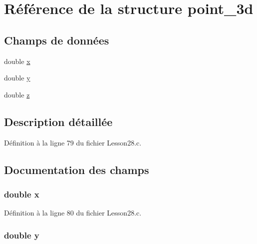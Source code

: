 \hypertarget{structpoint__3d}{}\section{Référence de la structure point\+\_\+3d}
\label{structpoint__3d}
\subsection*{Champs de données}
\begin{DoxyCompactItemize}
\item 
double \hyperlink{structpoint__3d_af88b946fb90d5f08b5fb740c70e98c10}{x}
\item 
double \hyperlink{structpoint__3d_ab927965981178aa1fba979a37168db2a}{y}
\item 
double \hyperlink{structpoint__3d_ab3e6ed577a7c669c19de1f9c1b46c872}{z}
\end{DoxyCompactItemize}


\subsection{Description détaillée}


Définition à la ligne 79 du fichier Lesson28.\+c.



\subsection{Documentation des champs}
\hypertarget{structpoint__3d_af88b946fb90d5f08b5fb740c70e98c10}{}
\subsubsection[{x}]{\setlength{\rightskip}{0pt plus 5cm}double x}\label{structpoint__3d_af88b946fb90d5f08b5fb740c70e98c10}


Définition à la ligne 80 du fichier Lesson28.\+c.

\hypertarget{structpoint__3d_ab927965981178aa1fba979a37168db2a}{}
\subsubsection[{y}]{\setlength{\rightskip}{0pt plus 5cm}double y}\label{structpoint__3d_ab927965981178aa1fba979a37168db2a}


